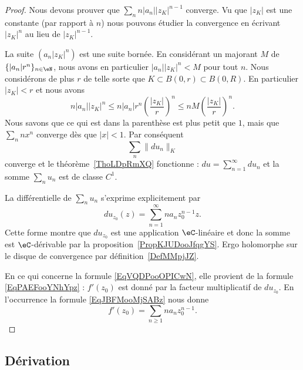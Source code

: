 \begin{proof}
	Nous devons prouver que \( \sum_nn| a_n | |z_K |^{n-1}\) converge. Vu que \( | z_K |\) est une constante (par rapport à \( n\)) nous pouvons étudier la convergence en écrivant \( | z_K |^n\) au lieu de \( | z_K |^{n-1}\).

	La suite \( (a_n| z_K |^n)\) est une suite bornée. En considérant un majorant \( M\) de \( \{ | a_n |r^n \}_{n\in \eN}\), nous avons en particulier \( | a_n | |z_K |^n<M\) pour tout \( n\). Nous considérons de plus \( r\) de telle sorte que \( K\subset B(0,r)\subset B(0,R)\). En particulier \( | z_K |<r\) et nous avons
	\begin{equation}
		n| a_n | |z_K |^n\leq n| a_n |r^n\left( \frac{ | z_K | }{ r } \right)^n\leq nM\left( \frac{ | z_K | }{ r } \right)^n.
	\end{equation}
	Nous savons que ce qui est dans la parenthèse est plus petit que \( 1\), mais que \( \sum_nnx^n\) converge dès que \( | x |<1\). Par conséquent
	\begin{equation}
		\sum_n\| du_n \|_K
	\end{equation}
	converge et le théorème~\ref{ThoLDpRmXQ} fonctionne : \( du=\sum_{n=1}^{\infty}du_n\) et la somme \( \sum_nu_n\) est de classe \( C^1\).

	La différentielle de \( \sum_nu_n\) s'exprime explicitement par
	\begin{equation}        \label{EqJBFMooMjSABz}
		du_{z_0}(z)=\sum_{n=1}^{\infty}na_nz_0^{n-1}z.
	\end{equation}
	Cette forme montre que \( du_{z_0}\) est une application \( \eC\)-linéaire et donc la somme est \( \eC\)-dérivable par la proposition~\ref{PropKJUDooJfqgYS}. Ergo holomorphe sur le disque de convergence par définition~\ref{DefMMpjJZ}.

	En ce qui concerne la formule \eqref{EqVQDPooOPICwN}, elle provient de la formule \eqref{EqPAEFooYNhYpz} : \( f'(z_0)\) est donné par la facteur multiplicatif de \( du_{z_0}\). En l'occurrence la formule \eqref{EqJBFMooMjSABz} nous donne
	\begin{equation}
		f'(z_0)=\sum_{n\geq 1}na_nz_0^{n-1}.
	\end{equation}
\end{proof}

\subsection{Dérivation}

